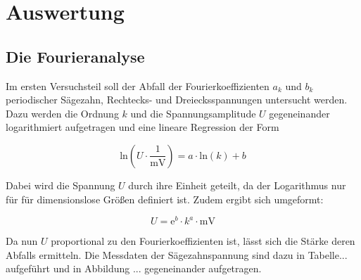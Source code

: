 \section{Auswertung}
\label{sec:Auswertung}

\subsection{Die Fourieranalyse}

Im ersten Versuchsteil soll der Abfall der Fourierkoeffizienten $a_k$ und $b_k$
periodischer Sägezahn, Rechtecks- und Dreiecksspannungen untersucht werden.
Dazu werden die Ordnung $k$ und die Spannungsamplitude $U$ gegeneinander
logarithmiert aufgetragen und eine lineare Regression der Form

\begin{equation}
    \text{ln} \left(U \cdot \frac{1}{\si{\milli\volt}} \right) = a \cdot \text{ln}(k) + b
\end{equation}

Dabei wird die Spannung $U$ durch ihre Einheit geteilt, da der Logarithmus nur für
für dimensionslose Größen definiert ist. Zudem ergibt sich umgeformt:

\begin{equation}
    U = \text{e}^b \cdot k^a \cdot \si{\milli\volt}
\end{equation}

Da nun $U$ proportional zu den Fourierkoeffizienten ist, lässt sich die
Stärke deren Abfalls ermitteln.
Die Messdaten der Sägezahnspannung sind dazu in Tabelle... aufgeführt und in 
Abbildung ... gegeneinander aufgetragen.




